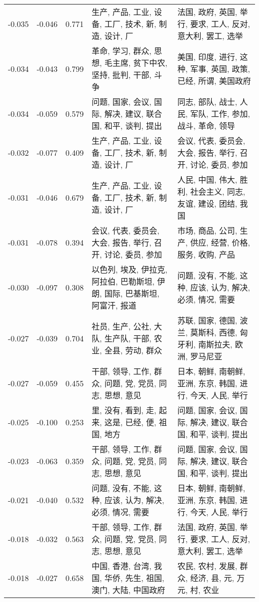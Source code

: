 \begin{tabular}{cccp{5cm}p{5cm}}
-0.035 & -0.046 & 0.771 & 生产, 产品, 工业, 设备, 工厂, 技术, 新, 制造, 设计, 厂 & 法国, 政府, 英国, 举行, 要求, 工人, 反对, 意大利, 罢工, 选举 \\
-0.034 & -0.043 & 0.799 & 革命, 学习, 群众, 思想, 毛主席, 贫下中农, 坚持, 批判, 干部, 斗争 & 美国, 印度, 进行, 这种, 军事, 英国, 政策, 已经, 所谓, 美国政府 \\
-0.034 & -0.059 & 0.579 & 问题, 国家, 会议, 国际, 解决, 建议, 联合国, 和平, 谈判, 提出 & 同志, 部队, 战士, 人民, 军队, 工作, 参加, 战斗, 革命, 领导 \\
-0.032 & -0.077 & 0.409 & 生产, 产品, 工业, 设备, 工厂, 技术, 新, 制造, 设计, 厂 & 会议, 代表, 委员会, 大会, 报告, 举行, 召开, 讨论, 委员, 参加 \\
-0.031 & -0.046 & 0.679 & 生产, 产品, 工业, 设备, 工厂, 技术, 新, 制造, 设计, 厂 & 人民, 中国, 伟大, 胜利, 社会主义, 同志, 友谊, 建设, 团结, 我国 \\
-0.031 & -0.078 & 0.394 & 会议, 代表, 委员会, 大会, 报告, 举行, 召开, 讨论, 委员, 参加 & 市场, 商品, 公司, 生产, 供应, 经营, 价格, 服务, 收购, 产品 \\
-0.030 & -0.097 & 0.308 & 以色列, 埃及, 伊拉克, 阿拉伯, 巴勒斯坦, 伊朗, 国际, 巴基斯坦, 阿富汗, 报道 & 问题, 没有, 不能, 这种, 应该, 认为, 解决, 必须, 情况, 需要 \\
-0.027 & -0.039 & 0.704 & 社员, 生产, 公社, 大队, 生产队, 干部, 农业, 全县, 劳动, 群众 & 苏联, 国家, 德国, 波兰, 莫斯科, 西德, 匈牙利, 南斯拉夫, 欧洲, 罗马尼亚 \\
-0.027 & -0.059 & 0.455 & 干部, 领导, 工作, 群众, 问题, 党, 党员, 同志, 思想, 意见 & 日本, 朝鲜, 南朝鲜, 亚洲, 东京, 韩国, 进行, 今天, 人民, 举行 \\
-0.025 & -0.100 & 0.253 & 里, 没有, 看到, 走, 起来, 这是, 已经, 便, 祖国, 地方 & 问题, 国家, 会议, 国际, 解决, 建议, 联合国, 和平, 谈判, 提出 \\
-0.023 & -0.063 & 0.359 & 干部, 领导, 工作, 群众, 问题, 党, 党员, 同志, 思想, 意见 & 问题, 国家, 会议, 国际, 解决, 建议, 联合国, 和平, 谈判, 提出 \\
-0.021 & -0.040 & 0.532 & 问题, 没有, 不能, 这种, 应该, 认为, 解决, 必须, 情况, 需要 & 日本, 朝鲜, 南朝鲜, 亚洲, 东京, 韩国, 进行, 今天, 人民, 举行 \\
-0.018 & -0.032 & 0.563 & 干部, 领导, 工作, 群众, 问题, 党, 党员, 同志, 思想, 意见 & 法国, 政府, 英国, 举行, 要求, 工人, 反对, 意大利, 罢工, 选举 \\
-0.018 & -0.027 & 0.658 & 中国, 香港, 台湾, 我国, 华侨, 先生, 祖国, 澳门, 大陆, 中国政府 & 农民, 农村, 发展, 群众, 经济, 县, 元, 万元, 村, 农业 \\

\end{tabular}

